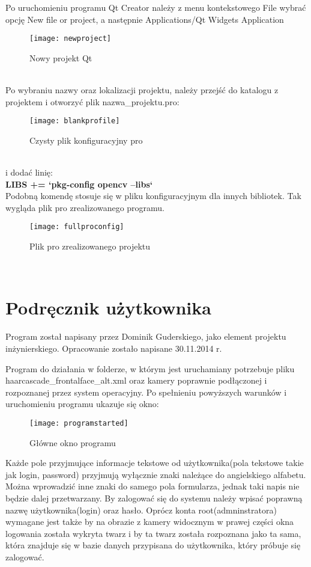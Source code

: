\documentclass[eng,printmode]{mgr}
\begin{document}
Po uruchomieniu programu Qt Creator należy z menu kontekstowego File wybrać opcję New file or project, a następnie Applications/Qt Widgets Application\\
\begin{figure}[placement h]
\texttt{[image: newproject]}
\caption{Nowy projekt Qt}
\end{figure}
\\
Po wybraniu nazwy oraz lokalizacji projektu, należy przejść do katalogu z projektem i otworzyć plik nazwa\_projektu.pro:\\
\begin{figure}[placement h]
\texttt{[image: blankprofile]}
\caption{Czysty plik konfiguracyjny pro}
\end{figure}\\
i dodać linię:\\
\textbf{LIBS += `pkg-config opencv --libs`}\\
Podobną komendę stosuje się w pliku konfiguracyjnym dla innych bibliotek. Tak wygląda plik pro zrealizowanego programu.\\
\begin{figure}[placement h]
\texttt{[image: fullproconfig]}
\caption{Plik pro zrealizowanego projektu}
\end{figure}\\


\section{Podręcznik użytkownika}
Program został napisany przez Dominik Guderskiego, jako element projektu inżynierskiego. Opracowanie zostało napisane 30.11.2014 r.

Program do działania w folderze, w którym jest uruchamiany potrzebuje pliku haarcascade\_frontalface\_alt.xml oraz kamery poprawnie podłączonej i rozpoznanej przez system operacyjny. Po spełnieniu powyższych warunków i uruchomieniu programu ukazuje się okno:\\

\begin{figure}[placement h]
\texttt{[image: programstarted]}
\caption{Główne okno programu}
\end{figure}

Każde pole przyjmujące informacje tekstowe od użytkownika(pola tekstowe takie jak login, password) przyjmują wyłącznie znaki należące do angielskiego alfabetu. Można wprowadzić inne znaki do samego pola formularza, jednak taki napis nie będzie dalej przetwarzany. By zalogować się do systemu należy wpisać poprawną nazwę użytkownika(login) oraz hasło. Oprócz konta root(admninstratora) wymagane jest także by na obrazie z kamery widocznym w prawej części okna logowania została wykryta twarz i by ta twarz została rozpoznana jako ta sama, która znajduje się w bazie danych przypisana do użytkownika, który próbuje się zalogować.
\end{document}
